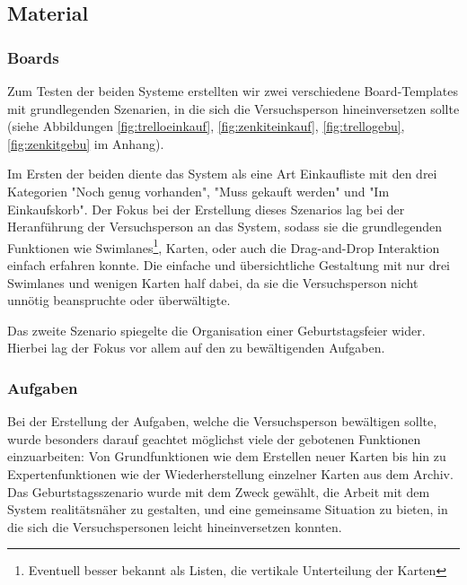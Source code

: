 \subsection{Material}

\subsubsection{Boards}
Zum Testen der beiden Systeme erstellten wir zwei verschiedene Board-Templates mit grundlegenden Szenarien, in die sich die Versuchsperson hineinversetzen sollte (siehe Abbildungen \ref{fig:trelloeinkauf}, \ref{fig:zenkiteinkauf}, \ref{fig:trellogebu}, \ref{fig:zenkitgebu} im Anhang).

Im Ersten der beiden diente das System als eine Art Einkaufliste mit den drei Kategorien "Noch genug vorhanden", "Muss gekauft werden" und "Im Einkaufskorb". Der Fokus bei der Erstellung dieses Szenarios lag bei der Heranführung der Versuchsperson an das System, sodass sie die grundlegenden Funktionen wie Swimlanes\footnote{Eventuell besser bekannt als Listen, die vertikale Unterteilung der Karten}, Karten, oder auch die Drag-and-Drop Interaktion einfach erfahren konnte. Die einfache und übersichtliche Gestaltung mit nur drei Swimlanes und wenigen Karten half dabei, da sie die Versuchsperson nicht unnötig beanspruchte oder überwältigte.

Das zweite Szenario spiegelte die Organisation einer Geburtstagsfeier wider. Hierbei lag der Fokus vor allem auf den zu bewältigenden Aufgaben.



\subsubsection{Aufgaben}
Bei der Erstellung der Aufgaben, welche die Versuchsperson bewältigen sollte, wurde besonders darauf geachtet möglichst viele der gebotenen Funktionen einzuarbeiten: Von Grundfunktionen wie dem Erstellen neuer Karten bis hin zu Expertenfunktionen wie der Wiederherstellung einzelner Karten aus dem Archiv. Das Geburtstagsszenario wurde mit dem Zweck gewählt, die Arbeit mit dem System realitätsnäher zu gestalten, und eine gemeinsame Situation zu bieten, in die sich die Versuchspersonen leicht hineinversetzen konnten.

